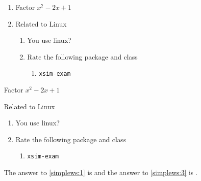 \documentclass{article}
\begin{document}
\begin{enumerate}[save-ans=simplews-2,columns=2,check-ans=true,show-pos,nosep,save-ref]
  \item Factor $x^{2}-2x+1$ 
  \item Related to Linux
    \begin{enumerate}[nosep,columns*=2]
      \item You use linux? 
      \item Rate the following package and class
        \begin{enumerate}
          \item \texttt{xsim-exam} 
        \end{enumerate}
    \end{enumerate}
\end{enumerate}
\stop














\begin{enumerate*}[save-ans=simplews,columns=2,check-ans=true,show-pos,nosep,save-ref]
  \item Factor $x^{2}-2x+1$ 
  \item Related to Linux
    \begin{enumerate}[nosep,columns*=2]
      \item You use linux? 
      \item Rate the following package and class
        \begin{enumerate}[nosep]
          \item \texttt{xsim-exam} 
        \end{enumerate}
    \end{enumerate}
\end{enumerate*}

The answer to \ref{simplews:1} is  and the answer
to \ref{simplews:3} is .

\end{document}

